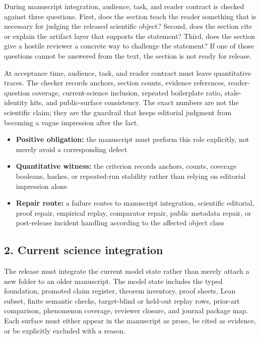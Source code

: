 During manuscript integration, audience, task, and reader contract is checked against three questions. First, does the section teach the reader something that is necessary for judging the released scientific object? Second, does the section cite or explain the artifact layer that supports the statement? Third, does the section give a hostile reviewer a concrete way to challenge the statement? If one of those questions cannot be answered from the text, the section is not ready for release.


At acceptance time, audience, task, and reader contract must leave quantitative traces. The checker records anchors, section counts, evidence references, reader-question coverage, current-science inclusion, repeated boilerplate ratio, stale-identity hits, and public-surface consistency. The exact numbers are not the scientific claim; they are the guardrail that keeps editorial judgment from becoming a vague impression after the fact.


\begin{itemize}[leftmargin=1.8em]

\item \textbf{Positive obligation:} the manuscript must perform this role explicitly, not merely avoid a corresponding defect

\item \textbf{Quantitative witness:} the criterion records anchors, counts, coverage booleans, hashes, or repeated-run stability rather than relying on editorial impression alone

\item \textbf{Repair route:} a failure routes to manuscript integration, scientific editorial, proof repair, empirical replay, comparator repair, public metadata repair, or post-release incident handling according to the affected object class

\end{itemize}

\subsection{2. Current science integration}

The release must integrate the current model state rather than merely attach a new folder to an older manuscript. The model state includes the typed foundation, promoted claim register, theorem inventory, proof sheets, Lean subset, finite semantic checks, target-blind or held-out replay rows, prior-art comparison, phenomenon coverage, reviewer closure, and journal package map. Each surface must either appear in the manuscript as prose, be cited as evidence, or be explicitly excluded with a reason.


